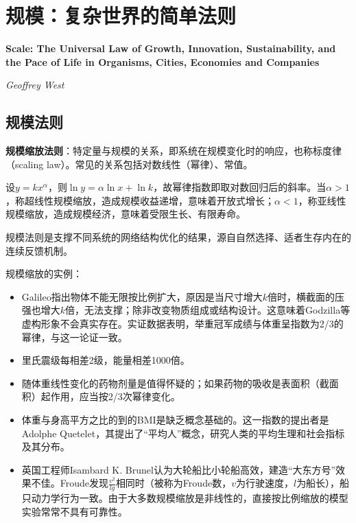 
\chapter{规模：复杂世界的简单法则}
\Large\textbf{Scale: The Universal Law of Growth, Innovation, Sustainability, and the Pace of Life in Organisms, Cities, Economies and Companies}
\par \emph{Geoffrey West} \normalsize

\section{规模法则}

\par \textbf{规模缩放法则}：特定量与规模的关系，即系统在规模变化时的响应，也称标度律（scaling law）。常见的关系包括对数线性（幂律）、常值。

\par 设$y=kx^\alpha$，则$\ln y= \alpha \ln x+\ln k$，故幂律指数即取对数回归后的斜率。当$\alpha>1$，称超线性规模缩放，造成规模收益递增，意味着开放式增长；$\alpha<1$，称亚线性规模缩放，造成规模经济，意味着受限生长、有限寿命。

\par 规模法则是支撑不同系统的网络结构优化的结果，源自自然选择、适者生存内在的连续反馈机制。

\par 规模缩放的实例：
\begin{itemize}
    \item Galileo指出物体不能无限按比例扩大，原因是当尺寸增大$k$倍时，横截面的压强也增大$k$倍，无法支撑；除非改变物质组成或结构设计。这意味着Godzilla等虚构形象不会真实存在。实证数据表明，举重冠军成绩与体重呈指数为2/3的幂律，与这一论证一致。
    \item 里氏震级每相差2级，能量相差1000倍。
    \item 随体重线性变化的药物剂量是值得怀疑的；如果药物的吸收是表面积（截面积）起作用，应当按2/3次幂律变化。
    \item 体重与身高平方之比的到的BMI是缺乏概念基础的。这一指数的提出者是Adolphe Quetelet，其提出了“平均人”概念，研究人类的平均生理和社会指标及其分布。
    \item 英国工程师Isambard K. Brunel认为大轮船比小轮船高效，建造“大东方号”效果不佳。Froude发现$\frac{v^2}{lg}$相同时（被称为Froude数，$v$为行驶速度，$l$为船长），船只动力学行为一致。由于大多数规模缩放是非线性的，直接按比例缩放的模型实验常常不具有可靠性。
    
\end{itemize}

